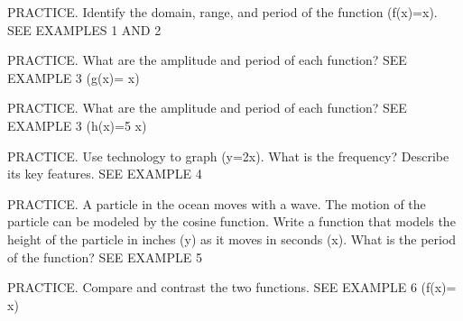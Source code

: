 \documentclass{article}
\newenvironment{practice}[2]{}{}        %
\newcommand{\answer}[1]{}               %
\newcommand{\placeholder}[2]{}          %
\newcommand{\te}[1]{}                   %
\begin{document}
\begin{practice}{13}{1}
PRACTICE. Identify the domain, range, and period of the function (f(x)=\cos x). SEE EXAMPLES 1 AND 2
\placeholder{graph}{Red cosine, arrowed x,y axes and O; x labels-2pi,-pi,pi,2pi, gridpi/4; y labels1,-1, grid1/4, window-9pi/4 to9pi/4,-5/4 to5/4. Maxima(-2pi,1),(0,1),(2pi,1), minima(-pi,-1),(pi,-1), zeros oddpi/2. Curve end arrows.}
\answer{domain: (-\infty<x<\infty); range: (-1\leq y\leq1); period:(2\pi)}
\end{practice}
\begin{practice}{14}{1}
PRACTICE. What are the amplitude and period of each function? SEE EXAMPLE 3
(g(x)=\cos{} x)
\answer{amplitude:(\frac12); period:(16\pi)}
\end{practice}
\begin{practice}{15}{1}
PRACTICE. What are the amplitude and period of each function? SEE EXAMPLE 3
(h(x)=5\sin{} x)
\answer{amplitude:5; period:(8\pi)}
\end{practice}
\begin{practice}{16}{2}
PRACTICE. Use technology to graph (y=\sin2x). What is the frequency? Describe its key features. SEE EXAMPLE 4
\answer{domain ((-\infty,\infty)); range[-\frac34,\frac34]; amplitude(\frac34); period(\pi); midline(y=0); frequency(\frac1\pi).}
\end{practice}
\begin{practice}{17}{2}
PRACTICE. A particle in the ocean moves with a wave. The motion of the particle can be modeled by the cosine function. Write a function that models the height of the particle in inches (y) as it moves in seconds (x). What is the period of the function? SEE EXAMPLE 5
\placeholder{illustration}{Blue ocean waves on pale blue sky. Black vertical double-headed measurement arrow labeled14 in. spans from top of left crest down to nearby trough level. Callout pointing to crest: One wave every6 s.}
\answer{(y=14\cos\frac\pi3 x); 6 seconds}
\te{Printed14-inch arrow appears to span crest to trough; the printed answer treats14 as amplitude. If14 is full wave height, amplitude would be7.}
\end{practice}
\begin{practice}{18}{2}
PRACTICE. Compare and contrast the two functions. SEE EXAMPLE 6
(f(x)=\cos\frac{} x)
\placeholder{graph}{Red cosine curve on arrowed x,y grid, O; x labels-pi,pi, gridpi/4; y labels-1,1, grid1/2, window-5pi/4 to5pi/4,-2 to2. Maximum(0,1/4), minima(-pi,-1/4),(pi,-1/4), zeros plus/minuspi/2; end arrows.}
\answer{Both cosine functions have an amplitude of (\frac14). The period of in the graph is (2\pi) and the period of f is 6, Therefore, the function f has a smaller period.}
\te{Printed "period of in the graph" retained.}
\end{practice}
\end{document}
